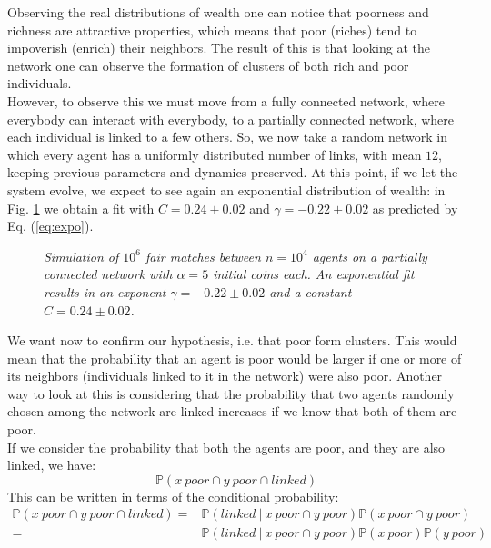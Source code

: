 Observing the real distributions of wealth one can notice that poorness and richness are attractive properties, which means that poor (riches) tend to impoverish (enrich) their neighbors.
The result of this is that looking at the network one can observe the formation of clusters of both rich and poor individuals. \\
However, to observe this we must move from a fully connected network, where everybody can interact with everybody, to a partially connected network, where each individual is linked to a few others.
So, we now take a random network in which every agent has a uniformly distributed number of links, with mean $12$, keeping previous parameters and dynamics preserved.
At this point, if we let the system evolve, we expect to see again an exponential distribution of wealth: in Fig. \ref{fig:fixedExpo} we obtain a fit with $C = 0.24 \pm 0.02$ and $\gamma = -0.22 \pm 0.02$ as predicted by Eq. (\ref{eq:expo}).
\begin{figure}[H]
    \centering
    \scalebox{.7}{}
    \caption{\emph{Simulation of $10^6$ fair matches between $n = 10^4$ agents on a partially connected network with $\alpha = 5$ initial coins each. 
                    An exponential fit results in an exponent $\gamma = -0.22 \pm 0.02$ and a constant $C = 0.24 \pm 0.02$.}}
    \label{fig:fixedExpo}
\end{figure}
We want now to confirm our hypothesis, i.e. that poor form clusters.
This would mean that the probability that an agent is poor would be larger if one or more of its neighbors (individuals linked to it in the network) were also poor.
Another way to look at this is considering that the probability that two agents randomly chosen among the network are linked increases if we know that both of them are poor. \\
If we consider the probability that both the agents are poor, and they are also linked, we have:
\begin{equation*}
    \mathbb{P}(x \ poor \cap y \ poor \cap linked)
\end{equation*}
This can be written in terms of the conditional probability:
\begin{equation*}
    \begin{split}
        \mathbb{P}(x \ poor \cap y \ poor \cap linked) =& \mathbb{P}(linked \ \vert \ x \ poor \cap y \ poor) \mathbb{P}(x \ poor \cap y \ poor)\\
	                                                   =& \mathbb{P}(linked \ \vert \ x \ poor \cap y \ poor) \mathbb{P}(x \ poor)\mathbb{P}(y \ poor)
    \end{split}
\end{equation*}
